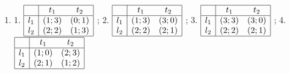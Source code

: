 \begin{problem}
\begin{enumerate}
\item	1.  $\begin{array}{|c|cc|}  \hline {} & {t_{1} } & {t_{2} } \\  \hline {l_{1} } & {\left(1;3\right)} & {\left(0;1\right)} \\ {l_{2} } & {\left(2;2\right)} & {\left(1;3\right)} \\  \hline  \end{array}$ ; 2.  $\begin{array}{|c|cc|}  \hline {} & {t_{1} } & {t_{2} } \\  \hline {l_{1} } & {\left(1;3\right)} & {\left(3;0\right)} \\ {l_{2} } & {\left(2;2\right)} & {\left(2;1\right)} \\  \hline  \end{array}$ ; 3.  $\begin{array}{|c|cc|}  \hline {} & {t_{1} } & {t_{2} } \\  \hline {l_{1} } & {\left(3;3\right)} & {\left(3;0\right)} \\ {l_{2} } & {\left(2;2\right)} & {\left(2;1\right)} \\  \hline  \end{array}$ ; 4.  $\begin{array}{|c|cc|}  \hline {} & {t_{1} } & {t_{2} } \\  \hline {l_{1} } & {\left(1;0\right)} & {\left(2;3\right)} \\ {l_{2} } & {\left(2;1\right)} & {\left(1;2\right)} \\  \hline  \end{array}$ \\

\end{enumerate}
\end{problem}
